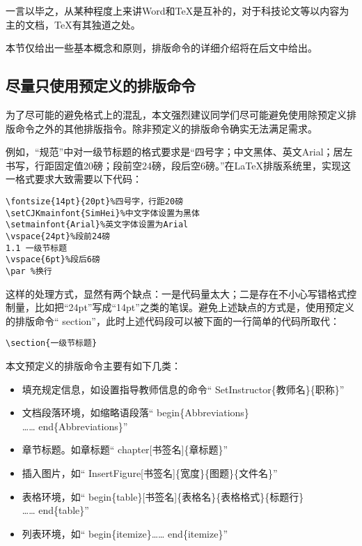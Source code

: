 \documentclass{Diploma}
\begin{document}
一言以毕之，从某种程度上来讲Word和\TeX 是互补的，对于科技论文等以内容为主的文档，\TeX 有其独道之处。

本节仅给出一些基本概念和原则，排版命令的详细介绍将在后文中给出。

\subsection{尽量只使用预定义的排版命令}
为了尽可能的避免格式上的混乱，本文强烈建议同学们尽可能避免使用除预定义排版命令之外的其他排版指令。除非预定义的排版命令确实无法满足需求。

例如，“规范”中对一级节标题的格式要求是“四号字；中文黑体、英文Arial；居左书写，行距固定值20磅；段前空24磅，段后空6磅。”在\LaTeX 排版系统里，实现这一格式要求大致需要以下代码：
\begin{verbatim}
\fontsize{14pt}{20pt}%四号字，行距20磅
\setCJKmainfont{SimHei}%中文字体设置为黑体
\setmainfont{Arial}%英文字体设置为Arial
\vspace{24pt}%段前24磅
1.1 一级节标题
\vspace{6pt}%段后6磅
\par %换行
\end{verbatim}
这样的处理方式，显然有两个缺点：一是代码量太大；二是存在不小心写错格式控制量，比如把“24pt”写成“14pt”之类的笔误。避免上述缺点的方式是，使用预定义的排版命令“ section”，此时上述代码段可以被下面的一行简单的代码所取代：
\begin{verbatim}
\section{一级节标题}
\end{verbatim}

本文预定义的排版命令主要有如下几类：
\begin{itemize}
  \item 填充规定信息，如设置指导教师信息的命令“ SetInstructor\{教师名\}\{职称\}”
  \item 文档段落环境，如缩略语段落“ begin\{Abbreviations\}\\
  …… end\{Abbreviations\}”
  \item 章节标题。如章标题“ chapter[书签名]\{章标题\}”
  \item 插入图片，如“ InsertFigure[书签名]\{宽度\}\{图题\}\{文件名\}”
  \item 表格环境，如“ begin\{table\}[书签名]\{表格名\}\{表格格式\}\{标题行\}\\
  …… end\{table\}”
  \item 列表环境，如“ begin\{itemize\}…… end\{itemize\}”
\end{itemize}
\end{document}
